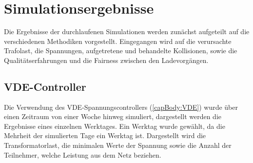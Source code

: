 \section{Simulationsergebnisse}
Die Ergebnisse der durchlaufenen Simulationen werden zunächst aufgeteilt auf die verschiedenen Methodiken vorgestellt. Eingegangen wird auf die verursachte Trafolast, die Spannungen, aufgetretene und behandelte Kollisionen, sowie die Qualitätserfahrungen und die Fairness zwischen den Ladevorgängen. 
\subsection{VDE-Controller}
\label{chap_VDE}
Die Verwendung des VDE-Spannungscontrollers (\ref{capBody:VDE}) wurde über einen Zeitraum von einer Woche hinweg simuliert, dargestellt werden die Ergebnisse eines einzelnen Werktages. Ein Werktag wurde gewählt, da die Mehrheit der simulierten Tage ein Werktag ist. Dargestellt wird die Transformatorlast, die minimalen Werte der Spannung sowie die Anzahl der Teilnehmer, welche Leistung aus dem Netz beziehen. 

